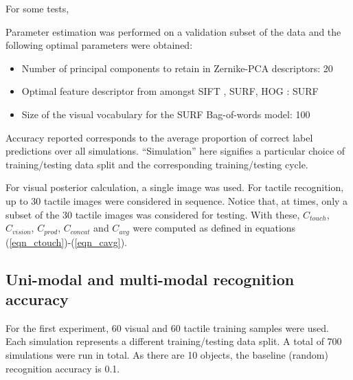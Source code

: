 \documentclass[9pt,technote]{IEEEtran}  %
\begin{document}
\begin{figure}
	\centering
\end{figure}

For some tests, 

\begin{figure}[b]
	\centering
\end{figure}
	
Parameter estimation was performed on a validation subset of the data and the following optimal parameters were obtained:
\begin{itemize}
	\item Number of principal components to retain in Zernike-PCA descriptors: 20
	\item Optimal feature descriptor from amongst SIFT \cite{Lowe1999}, SURF, HOG \cite{Dalal2005}: SURF
	\item Size of the visual vocabulary for the SURF Bag-of-words model: 100
\end{itemize}
Accuracy reported corresponds to the average proportion of correct label predictions over all simulations. ``Simulation'' here signifies a particular choice of training/testing data split and the corresponding training/testing cycle.

For visual posterior calculation, a single image was used. For tactile recognition, up to 30 tactile images were considered in sequence. Notice that, at times, only a subset of the 30 tactile images was considered for testing. With these, $C_{touch}$, $C_{vision}$, $C_{prod}$, $C_{concat}$ and $C_{avg}$ were computed as defined in equations (\ref{eqn_ctouch})-(\ref{eqn_cavg}). 

\subsection{Uni-modal and multi-modal recognition accuracy}
For the first experiment, 60 visual and 60 tactile training samples were used. Each simulation represents a different training/testing data split. A total of 700 simulations were run in total. As there are 10 objects, the baseline (random) recognition accuracy is 0.1.
\end{document}
